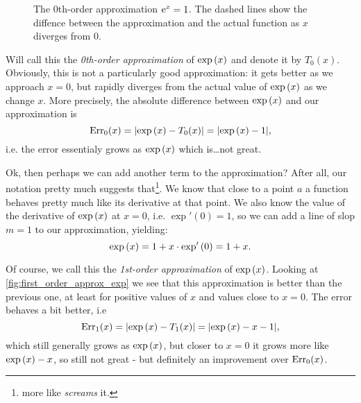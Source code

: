 \begin{figure}
  \centering
  \caption{The 0th-order approximation $\mathrm{e}^{x}=1$. The dashed lines show the diffence between the approximation and the actual function as $x$ diverges from $0$.}
  \label{fig:zero_order_approx_exp}
\end{figure}

Will call this the \emph{0th-order approximation} of $\exp\left(x\right)$ and denote it by $T_{0}(x)$. Obviously, this is not a particularly good approximation: it gets better as we approach $x=0$, but rapidly diverges from the actual value of $\exp\left(x\right)$ as we change $x$. More precisely, the absolute difference between $\exp\left(x\right)$ and our approximation is
\begin{equation}
  \text{Err}_{0}(x) = \lvert \exp\left(x\right) - T_{0}(x) \rvert = \lvert \exp\left(x\right)-1 \rvert,
  \label{eq:exp_err_0}
\end{equation}
i.e. the error essentialy grows as $\exp\left(x\right)$ which is\dots not great.

Ok, then perhaps we can add another term to the approximation? After all, our notation pretty much suggests that\footnote{more like \textit{screams} it.}. We know that close to a point $a$ a function behaves pretty much like its derivative at that point. We also know the value of the derivative of $\exp\left(x\right)$ at $x=0$, i.e. $\exp'(0)=1$, so we can add a line of slop $m=1$ to our approximation, yielding:
\begin{equation}
  \exp\left(x\right) = 1 + x\cdot\exp'\left(0\right) = 1+x.
  \label{eq:first_order_approx_exp}
\end{equation}

Of course, we call this the \emph{1st-order approximation} of $\exp\left(x\right)$. Looking at \autoref{fig:first_order_approx_exp} we see that this approximation is better than the previous one, at least for positive values of $x$ and values close to $x=0$. The error behaves a bit better, i.e
\begin{equation}
  \text{Err}_{1}(x) = \lvert \exp\left(x\right) - T_{1}(x) \rvert = \lvert \exp\left(x\right)-x-1 \rvert,
  \label{eq:exp_err_1}
\end{equation}
which still generally grows as $\exp\left(x\right)$, but closer to $x=0$ it grows more like $\exp\left(x\right)-x$, so still not great - but definitely an improvement over $\text{Err}_{0}(x)$.

